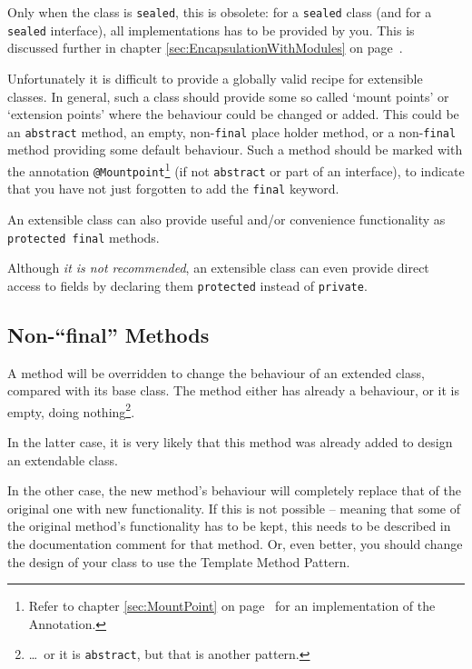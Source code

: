 \documentclass[11pt,a4paper, titlepage, parskip=half, headsepline, footsepline, cleardoublepage=current, headheight=1cm]{scrbook}
\newcommand*{\tqvref}[1]{\hyperref[{#1}]{\ref*{#1}} on page~\pageref{#1}}
\begin{document}
Only when the class is \lstinline|sealed|\autocite{ORACLE_DOC_LANGUAGE_SPECIFICATION:SealedClasses, ORACLE_DOC_LANGUAGE_SPECIFICATION:SealedInterfaces}, this is obsolete: for a \lstinline|sealed| class (and for a \lstinline|sealed| interface), all implementations has to be provided by you. This is discussed further in chapter \tqvref{sec:EncapsulationWithModules}.

Unfortunately it is difficult to provide a globally valid recipe for extensible classes. In general, such a class should provide some so called ‘mount points’ or ‘extension points’ where the behaviour could be changed or added. This could be an \lstinline|abstract| method, an empty, non-\lstinline|final| place holder method, or a non-\lstinline|final| method providing some default behaviour. Such a method should be marked with the annotation \lstinline|@Mountpoint|\footnote{Refer to chapter \tqvref{sec:MountPoint} for an implementation of the Annotation.} (if not \lstinline|abstract| or part of an interface), to indicate that you have not just forgotten to add the \lstinline|final| keyword.

An extensible class can also provide useful and/or convenience functionality as \lstinline|protected final| methods. 

Although \textit{it is not recommended}, an extensible class can even provide direct access to fields by declaring them \lstinline|protected| instead of \lstinline|private|.

\subsection{Non-“final” Methods}\label{sec:NonFinalMethods}
A method will be overridden to change the behaviour of an extended class, compared with its base class. The method either has already a behaviour, or it is empty, doing nothing\footnote{…~or it is \lstinline|abstract|, but that is another pattern.}.

In the latter case, it is very likely that this method was already added to design an extendable class.

In the other case, the new method's behaviour will completely replace that of the original one with new functionality. If this is not possible – meaning that some of the original method's functionality has to be kept, this needs to be described in the documentation comment for that method. Or, even better, you should change the design of your class to use the Template Method Pattern\autocite{Gamma:DesignPatterns}.
\end{document}
